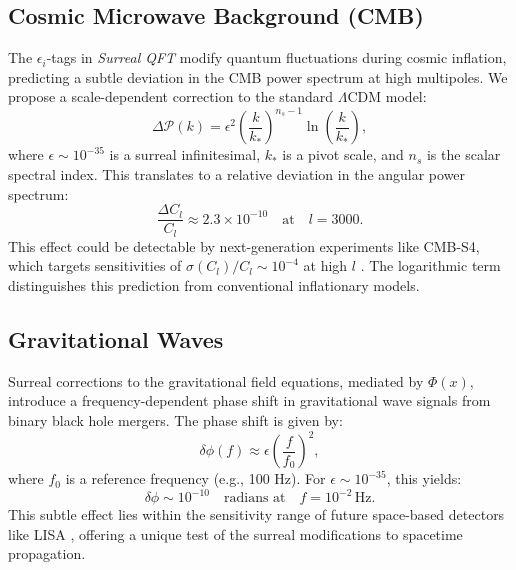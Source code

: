 \documentclass{article}
\begin{document}
\subsection{Cosmic Microwave Background (CMB)}
The \(\epsilon_i\)-tags in \textit{Surreal QFT} modify quantum fluctuations during cosmic inflation, predicting a subtle deviation in the CMB power spectrum at high multipoles. We propose a scale-dependent correction to the standard \(\Lambda\)CDM model:
\begin{equation}
\Delta \mathcal{P}(k) = \epsilon^2 \left( \frac{k}{k_*} \right)^{n_s - 1} \ln \left( \frac{k}{k_*} \right),
\end{equation}
where \(\epsilon \sim 10^{-35}\) is a surreal infinitesimal, \(k_*\) is a pivot scale, and \(n_s\) is the scalar spectral index. This translates to a relative deviation in the angular power spectrum:
\begin{equation}
\frac{\Delta C_l}{C_l} \approx 2.3 \times 10^{-10} \quad \text{at} \quad l = 3000.
\end{equation}
This effect could be detectable by next-generation experiments like CMB-S4, which targets sensitivities of \(\sigma(C_l) / C_l \sim 10^{-4}\) at high \(l\) \cite{SimonsObs2024}. The logarithmic term distinguishes this prediction from conventional inflationary models.

\subsection{Gravitational Waves}
Surreal corrections to the gravitational field equations, mediated by \(\Phi(x)\), introduce a frequency-dependent phase shift in gravitational wave signals from binary black hole mergers. The phase shift is given by:
\begin{equation}
\delta \phi(f) \approx \epsilon \left( \frac{f}{f_0} \right)^2,
\end{equation}
where \(f_0\) is a reference frequency (e.g., 100 Hz). For \(\epsilon \sim 10^{-35}\), this yields:
\begin{equation}
\delta \phi \sim 10^{-10} \quad \text{radians at} \quad f = 10^{-2} \, \text{Hz}.
\end{equation}
This subtle effect lies within the sensitivity range of future space-based detectors like LISA \cite{Amaro-Seoane2017}, offering a unique test of the surreal modifications to spacetime propagation.
\end{document}
